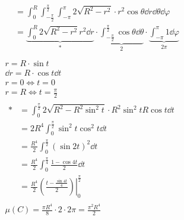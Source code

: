 \begin{bsp*}
\begin{gather*}
\begin{split}
				&= \int_0^R \int_{-\frac{\pi}{2}}^{\frac{\pi}{2}} \int_{-\pi}^\pi 2 \sqrt{R^2 - r^2} \cdot r^2 \cos \theta \dd r \dd \theta \dd \varphi \\
				&= \underbrace{\int_0^R 2 \sqrt{R^2 - r^2} r^2 \dd r}_{*} \cdot \underbrace{\int_{-\frac{\pi}{2}}^{\frac{\pi}{2}} \cos \theta \dd \theta}_{2} \cdot \underbrace{\int_{-\pi}^\pi 1 \dd \varphi}_{2\pi} \\
		\end{split} \\
		r = R \cdot \sin t \\ 
		\dd r = R \cdot \cos t \dd t \\
		r = 0 \iff t = 0 \\
		r = R \iff t = \frac{\pi}{2} \\
		\begin{split}
			*
				&= \int_0^{\frac{\pi}{2}} 2 \sqrt{R^2 - R^2 \sin^2 t} \cdot R^2 \sin^2 t R \cos t \dd t \\
				&= 2R^4 \int_0^{\frac{\pi}{2}} \sin^2 t \cos^2 t \dd t \\
				&= \frac{R^4}{2} \int_0^{\frac{\pi}{2}} (\sin 2t)^2 \dd t \\
				&= \frac{R^4}{2} \int_0^{\frac{\pi}{4}} \frac{1 - \cos 4t}{2} \dd t \\
				&= \frac{R^4}{2} \left. \left( \frac{t - \frac{\sin 4t}{4}}{2} \right) \right|_0^{\frac{\pi}{2}}
		\end{split} \\
		\mu(C) = \frac{\pi R^4}{8} \cdot 2 \cdot 2\pi = \frac{\pi^2 R^4}{2}
	\end{gather*}
\end{bsp*}

